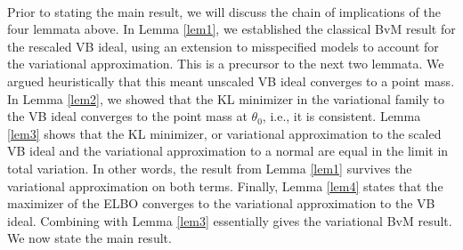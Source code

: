 \paragraph{} Prior to stating the main result, we will discuss the chain of implications of the four lemmata above. In Lemma \ref{lem1}, we established the classical BvM result for the rescaled VB ideal, using an extension to misspecified models to account for the variational approximation. This is a precursor to the next two lemmata. We argued heuristically that this meant unscaled VB ideal converges to a point mass. In Lemma \ref{lem2}, we showed that the KL minimizer in the variational family to the VB ideal converges to the point mass at $\theta_0$, i.e., it is consistent. Lemma \ref{lem3} shows that the KL minimizer, or variational approximation to the scaled VB ideal and the variational approximation to a normal are equal in the limit in total variation. In other words, the result from Lemma \ref{lem1} survives the variational approximation on both terms. Finally, Lemma \ref{lem4} states that the maximizer of the ELBO converges to the variational approximation to the VB ideal. Combining with Lemma \ref{lem3} essentially gives the variational BvM result. We now state the main result. 

